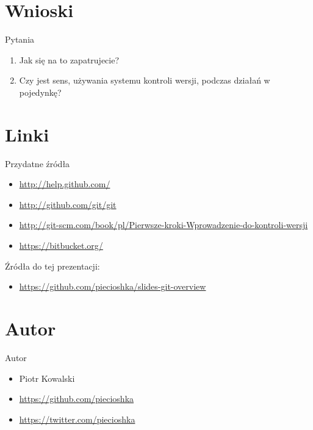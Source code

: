 \documentclass{beamer}
\begin{document}

\section{Wnioski}

\begin{frame}{Pytania}
\begin{enumerate}
  \item Jak się na to zapatrujecie?
  \item Czy jest sens, używania systemu kontroli wersji, podczas działań w pojedynkę?
\end{enumerate}
\end{frame}


\section{Linki}

\begin{frame}{Przydatne źródła}
\begin{itemize}
  \item \url{http://help.github.com/}
  \item \url{http://github.com/git/git}
  \item \url{http://git-scm.com/book/pl/Pierwsze-kroki-Wprowadzenie-do-kontroli-wersji}
  \item \url{https://bitbucket.org/}
\end{itemize}
\vskip 1cm
Źródła do tej prezentacji:
\begin{itemize}
  \item \url{https://github.com/piecioshka/slides-git-overview}

\end{itemize}
\end{frame}


\section{Autor}

\begin{frame}{Autor}
\begin{itemize}
  \item Piotr Kowalski
  \item \url{https://github.com/piecioshka}
  \item \url{https://twitter.com/piecioshka}
\end{itemize}
\end{frame}
\end{document}
